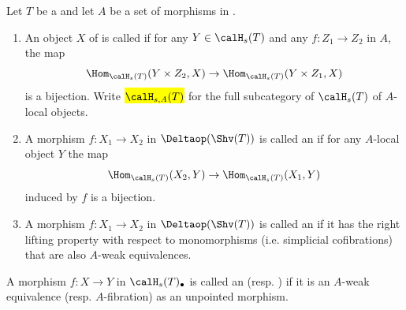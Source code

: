 \begin{definition} \label{definition:A_local_object_A_weak_equivalence_A_fibration_of_simplicial_homotopy_category_of_sheaves_of_a_small_site}
Let $T$ be a   and let $A$ be a set of morphisms in . 
\begin{enumerate}
    \item An object $X$ of  is called  if for any $Y \in \calH_s(T)$ and any $f: Z_1 \to Z_2$ in $A$, the map 
    $$\Hom_{\calH_s(T)}(Y \times Z_2, X) \to \Hom_{\calH_s(T)}(Y \times Z_1, X)$$
    is a bijection. Write \hl{$\calH_{s,A}(T)$} for the full subcategory of $\calH_s(T)$ of $A$-local objects. 
    \item A morphism $f: X_1 \to X_2$ in $\Deltaop(\Shv(T))$ is called an  if for any $A$-local object $Y$ the map
    $$\Hom_{\calH_s(T)}(X_2, Y) \to \Hom_{\calH_s(T)}(X_1, Y)$$
    induced by $f$ is a bijection. 
    \item A morphism $f: X_1 \to X_2$ in $\Deltaop(\Shv(T))$ is called an  if it has the right lifting property with respect to monomorphisms (i.e. simplicial cofibrations) that are also $A$-weak equivalences.
\end{enumerate}
A morphism $f: X \to Y$ in $\calH_s(T)_\bullet$ is called an  (resp. ) if it is an $A$-weak equivalence (resp. $A$-fibration) as an unpointed morphism.
\end{definition}